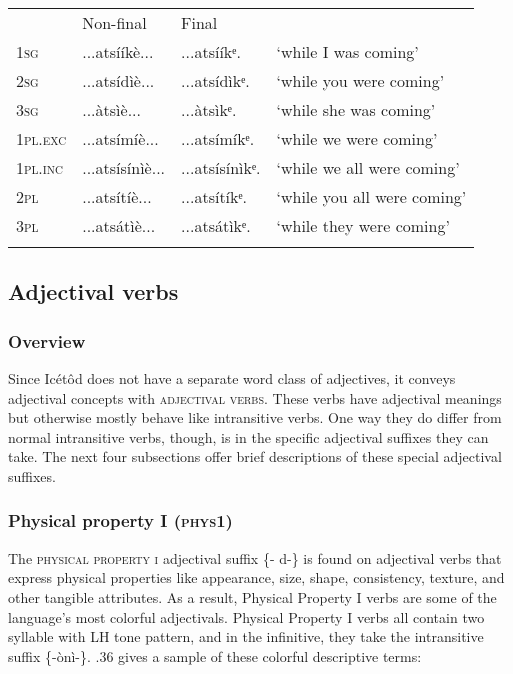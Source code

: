 \begin{table}
\begin{table}
\begin{tabularx}{\textwidth}{XXXX} & Non-final & Final & \\
\lsptoprule
\textsc{1sg} & ...atsííkè... & ...atsííkᵉ. & ‘while I was coming’\\
\textsc{2sg} & ...atsídìè... & ...atsídìkᵉ. & ‘while you were coming’\\
\textsc{3sg} & ...àtsìè... & ...àtsìkᵉ. & ‘while she was coming’\\
\textsc{1pl.exc} & ...atsímíè... & ...atsímíkᵉ. & ‘while we were coming’\\
\textsc{1pl.inc} & ...atsísínìè... & ...atsísínìkᵉ. & ‘while we all were coming’\\
\textsc{2pl} & ...atsítíè... & ...atsítíkᵉ. & ‘while you all were coming’\\
\textsc{3pl} & ...atsátìè... & ...atsátìkᵉ. & ‘while they were coming’\\
\lspbottomrule
\end{tabularx}
\end{table}



\subsection{Adjectival verbs}
\subsubsection{Overview}

Since Icétôd does not have a separate word class of adjectives, it conveys adjectival concepts with \textsc{adjectival verbs}. These verbs have adjectival meanings but otherwise mostly behave like intransitive verbs. One way they do differ from normal intransitive verbs, though, is in the specific adjectival suffixes they can take. The next four subsections offer brief descriptions of these special adjectival suffixes.


\subsubsection{Physical property I (\textsc{phys1})}

The \textsc{physical property i }adjectival suffix \{- d-\} is found on adjectival verbs that express physical properties like appearance, size, shape, consistency, texture, and other tangible attributes. As a result, Physical Property I verbs are some of the language’s most colorful adjectivals. Physical Property I verbs all contain two syllable with LH tone pattern, and in the infinitive, they take the intransitive suffix \{-ònì-\}. .36 gives a sample of these colorful descriptive terms:



\end{table}
